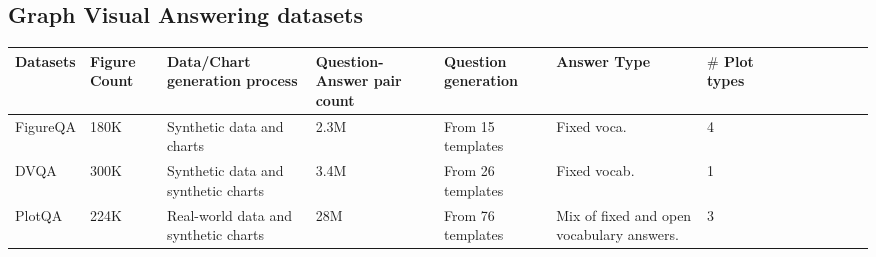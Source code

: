 \documentclass{article}
\begin{document}
\subsection{Graph Visual Answering datasets}
\begin{table}[!htbp]
\renewcommand{\arraystretch}{1.3}
\begin{adjustbox}{max width=\textwidth}
\begin{tabular}{p{2.33cm}p{2.33cm}p{2.33cm}p{2.33cm}p{2.33cm}p{2.33cm}p{2.99cm}p{2.33cm}p{2.33cm}p{2.33cm}p{2.33cm}p{2.33cm}p{2.33cm}p{2.99cm}}
\hline
\multicolumn{1}{|p{2.33cm}}{Datasets} & 
\multicolumn{1}{|p{2.33cm}}{Figure Count} & 
\multicolumn{1}{|p{2.33cm}}{Data/Chart generation process} & 
\multicolumn{1}{|p{2.33cm}}{Question-Answer pair count} & 
\multicolumn{1}{|p{2.33cm}}{Question generation} & 
\multicolumn{1}{|p{2.33cm}}{Answer Type} & 
\multicolumn{1}{|p{2.99cm}|}{$\#$ Plot types} \\ 
\hline
\multicolumn{1}{|p{2.33cm}}{FigureQA \cite{kahou2017figureqa}} & 
\multicolumn{1}{|p{2.33cm}}{180K} & 
\multicolumn{1}{|p{2.33cm}}{Synthetic data and charts} & 
\multicolumn{1}{|p{2.33cm}}{2.3M } & 
\multicolumn{1}{|p{2.33cm}}{From 15 templates} & 
\multicolumn{1}{|p{2.33cm}}{Fixed voca. } & 
\multicolumn{1}{|p{2.99cm}|}{4} \\ 
\hline
\multicolumn{1}{|p{2.33cm}}{DVQA \cite{kafle2018}} & 
\multicolumn{1}{|p{2.33cm}}{300K} & 
\multicolumn{1}{|p{2.33cm}}{Synthetic  data and synthetic charts} & 
\multicolumn{1}{|p{2.33cm}}{3.4M} & 
\multicolumn{1}{|p{2.33cm}}{From 26 templates} & 
\multicolumn{1}{|p{2.33cm}}{Fixed vocab. } & 
\multicolumn{1}{|p{2.99cm}|}{1} \\ 
\hline
\multicolumn{1}{|p{2.33cm}}{PlotQA \cite{methani2020plotqa}} & 
\multicolumn{1}{|p{2.33cm}}{224K} & 
\multicolumn{1}{|p{2.33cm}}{Real-world data and synthetic charts} & 
\multicolumn{1}{|p{2.33cm}}{28M} & 
\multicolumn{1}{|p{2.33cm}}{From 76 templates } & 
\multicolumn{1}{|p{2.33cm}}{Mix of fixed and open vocabulary answers. } & 
\multicolumn{1}{|p{2.99cm}|}{3 \newline
} \\ 


\end{tabular}
\end{adjustbox}
\end{table}
\end{document}
